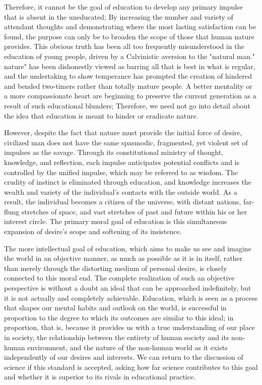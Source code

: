 \documentclass[a4paper,12pt]{book}[2004/02/16]
\theoremstyle{ilemma}
\theoremstyle{itheorem}
\theoremstyle{iother}
\theoremstyle{icorollary}
\theoremstyle{numcorollary}
\theoremstyle{idefinition}
\begin{document}
Therefore, it cannot be the goal of education to develop any primary impulse that is absent in the uneducated; By increasing the number and variety of attendant thoughts and demonstrating where the most lasting satisfaction can be found, the purpose can only be to broaden the scope of those that human nature provides. This obvious truth has been all too frequently misunderstood in the education of young people, driven by a Calvinistic aversion to the "natural man." nature" has been
dishonestly viewed as barring all that is best in what is regular, and
the undertaking to show temperance has prompted the creation of hindered and
bended two-timers rather than totally mature people. A better mentality or a more compassionate heart are beginning to preserve the current generation as a result of such educational blunders; Therefore, we need not go into detail about the idea that education is meant to hinder or eradicate nature.

However, despite the fact that nature must provide the initial force of desire, civilized man does not have the same spasmodic, fragmented, yet violent set of impulses as the savage. Through its constitutional ministry of thought, knowledge, and reflection, each impulse anticipates potential conflicts and is controlled by the unified impulse, which may be referred to as wisdom. The crudity of instinct is eliminated through education, and knowledge increases the wealth and variety of the individual's contacts with the outside world. As a result, the individual becomes a citizen of the universe, with distant nations, far-flung stretches of space, and vast stretches of past and future within his or her interest circle. The primary moral goal of education is this simultaneous expansion of desire's scope and softening of its insistence.

The more intellectual goal of education, which aims to make us see and imagine the world in an objective manner, as much as possible as it is in itself, rather than merely through the distorting medium of personal desire, is closely connected to this moral end. The complete realization of such an objective perspective is without a doubt an ideal that can be approached indefinitely, but it is not actually and completely achievable.
Education, which is seen as a process that shapes our mental habits and outlook on the world, is successful in proportion to the degree to which its outcomes are similar to this ideal; in proportion, that is, because it provides us with a true understanding of our place in society, the relationship between the entirety of human society and its non-human environment, and the nature of the non-human world as it exists independently of our desires and interests. We can return to the discussion of science if this standard is accepted, asking how far science contributes to this goal and whether it is superior to its rivals in educational practice.
\end{document}
